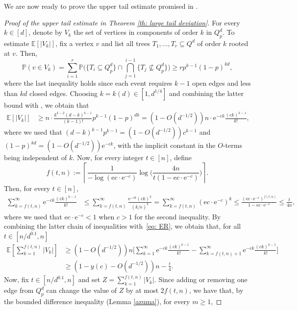 \documentclass[reqno,final,a4paper]{amsart}
\theoremstyle{definition}
\def\e{\mathrm{e}}
\newcommand{\1}{\mathbbm{1}}
\begin{document}
We are now ready to prove the upper tail estimate promised in .

\begin{proof}[Proof of the upper tail estimate in Theorem \ref{th: large tail deviation}]

For every $k\in [d]$, denote by $V_k$ the set of vertices in components of order $k$ in $Q^d_p$.
To estimate $\mathbb E[|V_k|]$, fix a vertex $v$ and list all trees $T_1,\ldots,T_r\subseteq Q^d$ of order $k$ rooted at $v$. Then,
\[\mathbb P(v\in V_k) = \sum_{i=1}^r \mathbb P\bigg(\{T_i\subseteq Q^d_p\}\cap \bigcap_{j=1}^{i-1} \{T_j\not\subseteq Q^d_p\}\bigg)\ge r p^{k-1} (1-p)^{kd},\]
where the last inequality holds since each event requires $k-1$ open edges and less than $kd$ closed edges.
Choosing $k=k(d)\in [1,d^{1/4}]$ and combining the latter bound with , we obtain that
\begin{align*}
    \mathbb{E}[|V_k|]&\ge n\cdot \frac{k^{k-2}(d-k)^{k-1}}{(k-1)!} p^{k-1}(1-p)^{dk} = (1-O(d^{-1/2})) n\cdot \e^{-ck}\frac{(ck)^{k-1}}{k!},
\end{align*}
where we used that $(d-k)^{k-1}p^{k-1} = (1-O(d^{-1/2}))c^{k-1}$ and $(1-p)^{kd} = (1-O(d^{-1/2}))\e^{-ck}$, with the implicit constant in the $O$-terms being independent of $k$.
Now, for every integer $t\in [n]$, define
\[f(t,n):= \left\lceil \frac{1}{-\log(\e c\cdot \e^{-c})} \log\bigg(\frac{4n}{t(1-\e c\cdot \e^{-c})}\bigg) \right\rceil.\] 
Then, for every $t \in [n]$, 
\begin{align*}
\sum_{k=f(t,n)}^{\infty}\e^{-ck}\frac{(ck)^{k-1}}{k!} &\leq  \sum_{k=f(t,n)}^{\infty} \frac{\e^{-ck}(ck)^{k}}{(k/\e)^k} = \sum_{k=f(t,n)}^{\infty} (\e c\cdot \e^{-c})^k \leq \frac{(\e c\cdot \e^{-c})^{f(t,n)}}{1-\e c\cdot \e^{-c}}
\le \frac{t}{4n},
\end{align*}
where we used that $\e c\cdot \e^{-c}<1$ when $c>1$ for the second inequality. By combining the latter chain of inequalities with~\eqref{eq: ER}, 
we obtain that, for all $t\in [n/d^{0.1},n]$
\begin{align*}
\mathbb{E}\left[\sum_{k=1}^{f(t,n)}|V_k|\right]&\ge (1-O(d^{-1/2}))n\bigg[\sum_{k=1}^{\infty}\e^{-ck}\frac{(ck)^{k-1}}{k!}
- \sum_{k=f(t,n)+1}^{\infty}\e^{-ck}\frac{(ck)^{k-1}}{k!}\bigg]
\\&\geq \left(1-y(c)-O(d^{-1/2})\right)n- \frac{t}{4}.
\end{align*}
Now, fix $t\in [n/d^{0.1},n]$ and set $Z=\sum_{k=1}^{f(t,n)}|V_k|$. Since adding or removing one edge from $Q^d_p$ can change the value of $Z$ by at most $2f(t,n)$, we have that, by the bounded difference inequality (Lemma \ref{azuma}), for every $m\ge 1$,

\end{proof}
\end{document}
